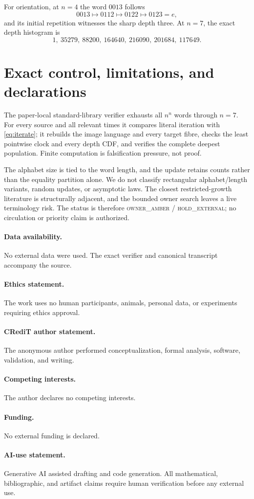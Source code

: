 \documentclass[a4paper,10pt]{amsart}
\theoremstyle{remark}
\begin{document}
For orientation, at $n=4$ the word $0013$ follows
\begin{equation*}
 0013\longmapsto0112\longmapsto0122\longmapsto0123=e,
\end{equation*}
and its initial repetition witnesses the sharp depth three.  At $n=7$, the
exact depth histogram is
\begin{equation*}
 1,\ 35279,\ 88200,\ 164640,\ 216090,\ 201684,\ 117649.
\end{equation*}

\section{Exact control, limitations, and declarations}

The paper-local standard-library verifier exhausts all $n^n$ words through
$n=7$.  For every source and all relevant times it compares literal
iteration with \eqref{eq:iterate}; it rebuilds the image language and every
target fibre, checks the least pointwise clock and every depth CDF, and
verifies the complete deepest population.  Finite computation is
falsification pressure, not proof.

The alphabet size is tied to the word length, and the update retains counts
rather than the equality partition alone.  We do not classify rectangular
alphabet/length variants, random updates, or asymptotic laws.  The closest
restricted-growth literature is structurally adjacent, and the bounded
owner search leaves a live terminology risk.  The status is therefore
\textsc{owner\_amber / hold\_external}; no circulation or priority claim is
authorized.

\paragraph{Data availability.}
No external data were used.  The exact verifier and canonical transcript
accompany the source.
\paragraph{Ethics statement.}
The work uses no human participants, animals, personal data, or experiments
requiring ethics approval.
\paragraph{CRediT author statement.}
The anonymous author performed conceptualization, formal analysis, software,
validation, and writing.
\paragraph{Competing interests.}
The author declares no competing interests.
\paragraph{Funding.}
No external funding is declared.
\paragraph{AI-use statement.}
Generative AI assisted drafting and code generation.  All mathematical,
bibliographic, and artifact claims require human verification before any
external use.



\end{document}
